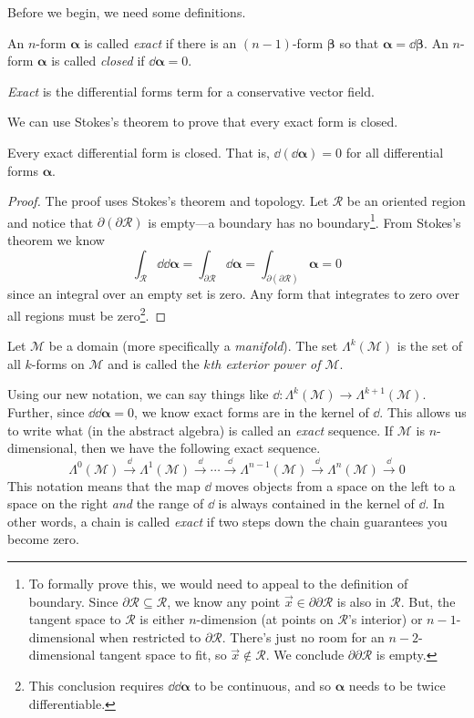 Before we begin, we need some definitions.
\begin{definition}
	An $n$-form $\bm\alpha$ is called \emph{exact} if there is an
	$(n-1)$-form $\bm\beta$ so that $\bm\alpha=\dd \bm\beta$.  An $n$-form
	$\bm\alpha$ is called \emph{closed} if $\dd \bm\alpha=0$.
\end{definition}
\emph{Exact} is the differential forms term for a conservative vector field.

We can use Stokes's theorem to prove that every exact form is closed.
\begin{theorem}
	Every exact differential form is closed.  That is, $\dd (\dd \bm\alpha)=0$
	for all differential forms $\bm\alpha$.
\end{theorem}
\begin{proof}
	The proof uses Stokes's theorem and topology.  Let $\mathcal R$
	be an oriented region and notice that $\partial (\partial \mathcal R)$ is
	empty---a boundary has no boundary\footnote{
		To formally prove this, we would need to appeal to the definition
		of boundary.  Since $\partial \mathcal R\subseteq \mathcal R$, 
		we know any point $\vec x\in\partial \partial \mathcal R$ is also in $\mathcal R$.
		But, the tangent space to $\mathcal R$ is either $n$-dimension (at points on
		$\mathcal R$'s interior) or $n-1$-dimensional when restricted to $\partial \mathcal R$.
		There's just no room for an $n-2$-dimensional tangent space to fit, so $\vec x\notin\mathcal R$.
		We conclude $\partial\partial \mathcal R$ is empty.
	}.
	From Stokes's theorem we know
	\[
		\int_{\mathcal R}\dd \dd \bm\alpha
		=
		\int_{\partial \mathcal R}\dd \bm\alpha
		=
		\int_{\partial (\partial \mathcal R)}\bm\alpha
		=0
	\]
	since an integral over an empty set is zero.  Any form that integrates to zero over
	all regions must be zero\footnote{ This conclusion requires $\dd \dd\bm\alpha$
	to be continuous, and so $\bm\alpha$ needs to be twice differentiable.}.
\end{proof}

\begin{definition}
	Let $\mathcal M$ be a domain (more specifically a \emph{manifold}).
	The set $\Lambda^k(\mathcal M)$ is the set of all $k$-forms on $\mathcal M$
	and is called the \emph{$k$th exterior power of $\mathcal M$}.
\end{definition}

Using our new notation, we can say things like $\dd:\Lambda^k(\mathcal M)\to \Lambda^{k+1}(\mathcal M)$.
Further, since $\dd\dd \bm\alpha=0$, we know exact forms are in the kernel of $\dd$.
This allows us to write what (in the abstract algebra) is called an \emph{exact} sequence.
If $\mathcal M$ is $n$-dimensional, then we have the following exact sequence.
\[
	\Lambda^0(\mathcal M) \xrightarrow{\dd}
	\Lambda^1(\mathcal M)\xrightarrow{\dd} \cdots 
	\xrightarrow{\dd} 
	\Lambda^{n-1}(\mathcal M)\xrightarrow{\dd}  
	\Lambda^{n}(\mathcal M)\xrightarrow{\dd}  0
\]
This notation means that the map $\dd$ moves objects from a space on the left
to a space on the right \emph{and} the range of $\dd$ is always contained in the
kernel of $\dd$.  In other words, a chain is called \emph{exact} if two
steps down the chain guarantees you become zero.

